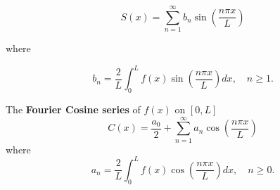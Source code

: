\documentclass[11pt]{article}
\begin{document}
\begin{preamble}
\begin{formulaitem}
\begin{equation*}
S(x) = \sum_{n=1}^{\infty} b_{n} \sin \left(\dfrac{n\pi x}{L}\right)
\end{equation*}

where 

\begin{equation*}
b_{n} = \dfrac{2}{L} \int_{0}^{L} f(x) \sin \left( \dfrac{n \pi x}{L} \right) dx, \quad n\geq 1.
\end{equation*}

\item The \textbf{Fourier Cosine series} of $f(x)$ on $[0, L]$
\begin{equation*}
C(x) = \frac{a_{0}}{2}+\sum_{n=1}^{\infty} a_{n} \cos \left(\dfrac{n\pi x}{L}\right)
\end{equation*}
where
\begin{equation*}
a_{n}=\frac{2}{L}\int_{0}^{L}f(x)\cos \left(\dfrac{n\pi x}{L}\right) dx, \quad n\geq 0.
\end{equation*}
\end{formulaitem}
\end{preamble}
\end{document}
